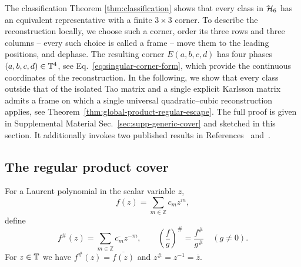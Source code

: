 The classification Theorem \ref{thm:classification} shows that every class in $\mathcal H_6$ has an equivalent representative with a finite $3\times3$ corner. To describe the reconstruction locally, we choose such a corner, order its three rows and three columns -- every such choice is called a frame -- move them to the leading positions, and dephase. The resulting corner $E(a,b,c,d)$ has four phases $(a,b,c,d)\in\mathbb T^4$, see Eq.~\eqref{eq:singular-corner-form}, which provide the continuous coordinates of the reconstruction. In the following, we show that every class outside that of the isolated Tao matrix and a single explicit Karlsson matrix admits a frame on which a single universal quadratic--cubic reconstruction applies, see Theorem~\ref{thm:global-product-regular-escape}.
The full proof is given in Supplemental Material Sec.~\ref{sec:supp-generic-cover} and sketched in this section. It additionally invokes two published results in References~\cite{BondalZhdanovskiy2016} and~\cite{BasuPollackRoy2006}.

\subsection{The regular product cover}
\label{subsec:quadratic-cubic-regular-cover}
For a Laurent polynomial in the scalar variable $z$,
\begin{equation}
f(z)=\sum_{m\in\mathbb Z}c_mz^m,
\end{equation}
define
\begin{equation}
f^\#(z)=\sum_{m\in\mathbb Z}\overline{c_m}z^{-m},
\qquad
\left(\frac{f}{g}\right)^\#=\frac{f^\#}{g^\#}\quad(g\neq0).
\label{eq:sharp-definition-main}
\end{equation}
For $z\in\mathbb T$ we have $f^\#(z)=\overline{f(z)}$ and $z^\#=z^{-1}=\overline z$.

